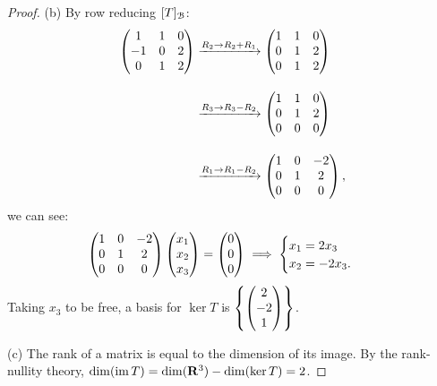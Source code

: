 \documentclass[10pt,twoside,openany]{memoir}
\begin{document}
{\begin{proof}
        (b) By row reducing $[T]_{\mathcal{B}}$:
            \begin{equation*}
            \begin{split}
                \left( \begin{matrix} 1 & 1 & 0 \\ -1 & 0 & 2 \\ 0 & 1 & 2 \end{matrix} \right)
                & \xrightarrow{R_2 \to R_2 + R_1}
                \left( \begin{matrix} 1 & 1 & 0 \\ 0 & 1 & 2 \\ 0 & 1 & 2 \end{matrix} \right) \\[1em]
                & \xrightarrow{R_3 \to R_3 - R_2}
                \left( \begin{matrix} 1 & 1 & 0 \\ 0 & 1 & 2 \\ 0 & 0 & 0 \end{matrix} \right) \\[1em]
                & \xrightarrow{R_1 \to R_1 - R_2}
                \left( \begin{matrix} 1 & 0 & -2 \\ 0 & 1 & 2 \\ 0 & 0 & 0 \end{matrix} \right),
            \end{split}
            \end{equation*}
            we can see:
                \begin{equation*}
                \begin{split}
                    \left( \begin{matrix} 1 & 0 & -2 \\ 0 & 1 & 2 \\ 0 & 0 & 0 \end{matrix} \right) \left( \begin{matrix} x_1 \\ x_2 \\ x_3 \end{matrix} \right) = \left( \begin{matrix} 0 \\ 0 \\ 0 \end{matrix} \right) 
                    & \implies \begin{cases}
                        x_1 = 2x_3 \\ x_2 = -2x_3.
                    \end{cases}
                \end{split}
                \end{equation*}
            Taking $x_3$ to be free, a basis for $\ker T$ is $\left\{ \left( \begin{matrix} 2 \\ -2 \\ 1 \end{matrix} \right) \right\}$.

        (c) The rank of a matrix is equal to the dimension of its image. By the rank-nullity theory, $\dim(\operatorname{im} T) = \dim(\mathbf{R}^3) - \dim (\ker T) = 2$.
    \end{proof}}
\end{document}
